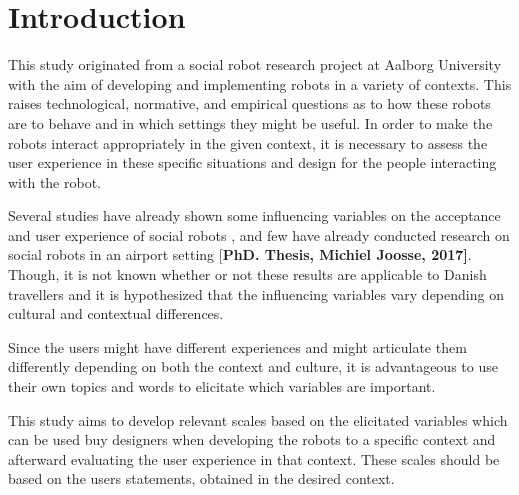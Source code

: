 \section{Introduction}
\label{Introduction}
%
This study originated from a social robot research project at Aalborg University with the aim of developing and implementing robots in a variety of contexts. This raises technological, normative, and empirical questions as to how these robots are to behave and in which settings they might be useful. In order to make the robots interact appropriately in the given context, it is necessary to assess the user experience in these specific situations and design for the people interacting with the robot.  




Several studies have already shown some influencing variables on the acceptance and user experience of social robots \cite{Graaf2013}  \cite{Graaf2015}, and few have already conducted research on social robots in an airport setting [\textbf{PhD. Thesis, Michiel Joosse, 2017]}. Though, it is not known whether or not these results are applicable to Danish travellers and it is hypothesized that the influencing variables vary depending on cultural and contextual differences.

Since the users might have different experiences and might articulate them differently depending on both the context and culture, it is advantageous to use their own topics and words to elicitate which variables are important.

This study aims to develop relevant scales based on the elicitated variables which can be used buy designers when developing the robots to a specific context and afterward evaluating the user experience in that context. These scales should be based on the users statements, obtained in the desired context.













